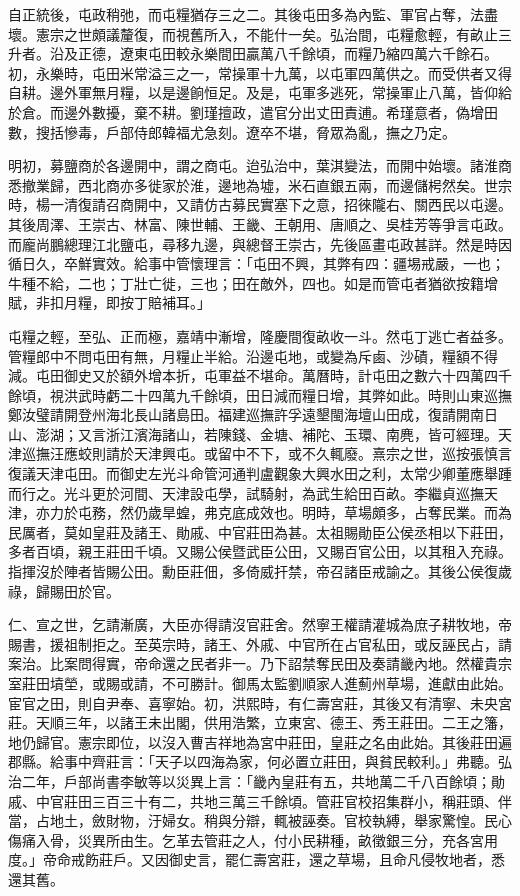 自正統後，屯政稍弛，而屯糧猶存三之二。其後屯田多為內監、軍官占奪，法盡壞。憲宗之世頗議釐復，而視舊所入，不能什一矣。弘治間，屯糧愈輕，有畝止三升者。沿及正德，遼東屯田較永樂間田贏萬八千餘頃，而糧乃縮四萬六千餘石。初，永樂時，屯田米常溢三之一，常操軍十九萬，以屯軍四萬供之。而受供者又得自耕。邊外軍無月糧，以是邊餉恒足。及是，屯軍多逃死，常操軍止八萬，皆仰給於倉。而邊外數擾，棄不耕。劉瑾擅政，遣官分出丈田責逋。希瑾意者，偽增田數，搜括慘毒，戶部侍郎韓福尤急刻。遼卒不堪，脅眾為亂，撫之乃定。

明初，募鹽商於各邊開中，謂之商屯。迨弘治中，葉淇變法，而開中始壞。諸淮商悉撤業歸，西北商亦多徙家於淮，邊地為墟，米石直銀五兩，而邊儲枵然矣。世宗時，楊一清復請召商開中，又請仿古募民實塞下之意，招徠隴右、關西民以屯邊。其後周澤、王崇古、林富、陳世輔、王畿、王朝用、唐順之、吳桂芳等爭言屯政。而龐尚鵬總理江北鹽屯，尋移九邊，與總督王崇古，先後區畫屯政甚詳。然是時因循日久，卒鮮實效。給事中管懷理言：「屯田不興，其弊有四：疆埸戒嚴，一也；牛種不給，二也；丁壯亡徙，三也；田在敵外，四也。如是而管屯者猶欲按籍增賦，非扣月糧，即按丁賠補耳。」

屯糧之輕，至弘、正而極，嘉靖中漸增，隆慶間復畝收一斗。然屯丁逃亡者益多。管糧郎中不問屯田有無，月糧止半給。沿邊屯地，或變為斥鹵、沙磧，糧額不得減。屯田御史又於額外增本折，屯軍益不堪命。萬曆時，計屯田之數六十四萬四千餘頃，視洪武時虧二十四萬九千餘頃，田日減而糧日增，其弊如此。時則山東巡撫鄭汝璧請開登州海北長山諸島田。福建巡撫許孚遠墾閩海壇山田成，復請開南日山、澎湖；又言浙江濱海諸山，若陳錢、金塘、補陀、玉環、南麂，皆可經理。天津巡撫汪應蛟則請於天津興屯。或留中不下，或不久輒廢。熹宗之世，巡按張慎言復議天津屯田。而御史左光斗命管河通判盧觀象大興水田之利，太常少卿董應舉踵而行之。光斗更於河間、天津設屯學，試騎射，為武生給田百畝。李繼貞巡撫天津，亦力於屯務，然仍歲旱蝗，弗克底成效也。明時，草場頗多，占奪民業。而為民厲者，莫如皇莊及諸王、勛戚、中官莊田為甚。太祖賜勛臣公侯丞相以下莊田，多者百頃，親王莊田千頃。又賜公侯暨武臣公田，又賜百官公田，以其租入充祿。指揮沒於陣者皆賜公田。勳臣莊佃，多倚威扞禁，帝召諸臣戒諭之。其後公侯復歲祿，歸賜田於官。

仁、宣之世，乞請漸廣，大臣亦得請沒官莊舍。然寧王權請灌城為庶子耕牧地，帝賜書，援祖制拒之。至英宗時，諸王、外戚、中官所在占官私田，或反誣民占，請案治。比案問得實，帝命還之民者非一。乃下詔禁奪民田及奏請畿內地。然權貴宗室莊田墳塋，或賜或請，不可勝計。御馬太監劉順家人進薊州草場，進獻由此始。宦官之田，則自尹奉、喜寧始。初，洪熙時，有仁壽宮莊，其後又有清寧、未央宮莊。天順三年，以諸王未出閣，供用浩繁，立東宮、德王、秀王莊田。二王之籓，地仍歸官。憲宗即位，以沒入曹吉祥地為宮中莊田，皇莊之名由此始。其後莊田遍郡縣。給事中齊莊言：「天子以四海為家，何必置立莊田，與貧民較利。」弗聽。弘治二年，戶部尚書李敏等以災異上言：「畿內皇莊有五，共地萬二千八百餘頃；勛戚、中官莊田三百三十有二，共地三萬三千餘頃。管莊官校招集群小，稱莊頭、伴當，占地土，斂財物，汙婦女。稍與分辯，輒被誣奏。官校執縛，舉家驚惶。民心傷痛入骨，災異所由生。乞革去管莊之人，付小民耕種，畝徵銀三分，充各宮用度。」帝命戒飭莊戶。又因御史言，罷仁壽宮莊，還之草場，且命凡侵牧地者，悉還其舊。

